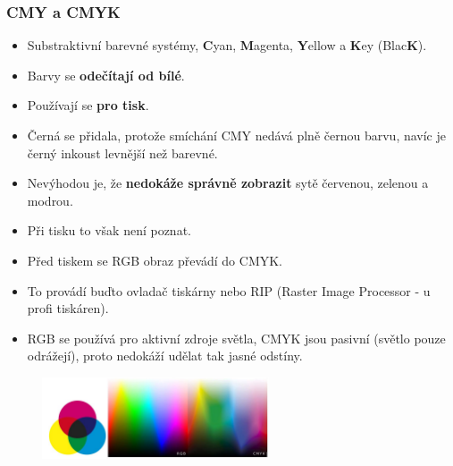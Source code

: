 \subsubsection{CMY a CMYK}
\begin{itemize}
	\item Substraktivní barevné systémy, \textbf{C}yan, \textbf{M}agenta, \textbf{Y}ellow a \textbf{K}ey (Blac\textbf{K}). 
	\item Barvy se \textbf{odečítají od bílé}.
	\item Používají se \textbf{pro tisk}.
	\item Černá se přidala, protože smíchání CMY nedává plně černou barvu, navíc je černý inkoust levnější než barevné.
	\item Nevýhodou je, že \textbf{nedokáže správně zobrazit} sytě červenou, zelenou a modrou.
	\item Při tisku to však není poznat.
	\item Před tiskem se RGB obraz převádí do CMYK.
	\item To provádí buďto ovladač tiskárny nebo RIP (Raster Image Processor - u profi tiskáren).
	\item RGB se používá pro aktivní zdroje světla, CMYK jsou pasivní (světlo pouze odrážejí), proto nedokáží udělat tak jasné odstíny.
\end{itemize}
	\begin{figure}[H]
	\centering
	\includegraphics[width=0.6\textwidth]{assets/1_cmyk}
	\end{figure}
